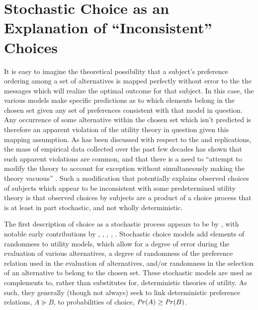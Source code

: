 \documentclass[../main.tex]{subfiles}
\begin{document}
\singlespacing
\section{Stochastic Choice as an Explanation of \enquote{Inconsistent} Choices}
\doublespacing

It is easy to imagine the theoretical possibility that a subject's preference ordering among a set of alternatives is mapped perfectly without error to the the messages which will realize the optimal outcome for that subject.
In this case, the various models make specific predictions as to which elements belong in the chosen set given any set of preferences consistent with that model in question.
Any occurrence of some alternative within the chosen set which isn't predicted is therefore an apparent violation of the utility theory in question given this mapping assumption.
As has been discussed with respect to the \textcite{Grether1979} and \textcite{Holt2002} replications, the mass of empirical data collected over the past few decades has shown that such apparent violations are common, and that there is a need to \enquote{attempt to modify the theory to account for  exception without simultaneously making the theory vacuous} \textcite[634]{Grether1979}.
Such a modification that potentially explains observed choices of subjects which appear to be inconsistent with some predetermined utility theory is that observed choices by subjects are a product of a choice process that is at least in part stochastic, and not wholly deterministic.

The first description of choice as a stochastic process appears to be by \textcite{Edwards1954}, with notable early contributions by \textcite{Luce1958}, \textcite{Debreu1958}, \textcite{Davidson1959}, \textcite{Becker1963}, \textcite{Luce1965}.
Stochastic choice models add elements of randomness to utility models, which allow for a degree of error during the evaluation of various alternatives, a degree of randomness of the preference relation used  in the evaluation of alternatives, and/or randomness in the selection of an alternative to belong to the chosen set.
These stochastic models are used as complements to, rather than substitutes for, deterministic theories of utility.
As such, they generally (though not always) seek to link deterministic preference relations, $A \succeq B$, to probabilities of choice, ${\mathit{Pr}}(A) \geq {\ensuremath{\mathit{Pr}}}(B)$.
\end{document}
